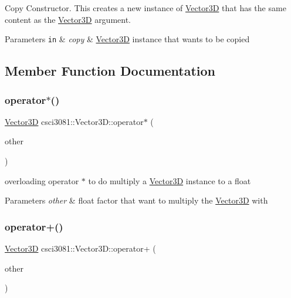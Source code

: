 Copy Constructor. This creates a new instance of \hyperlink{classcsci3081_1_1Vector3D}{Vector3D} that has the same content as the \hyperlink{classcsci3081_1_1Vector3D}{Vector3D} argument. 


\begin{DoxyParams}[1]{Parameters}
\mbox{\tt in}  & {\em copy} & \hyperlink{classcsci3081_1_1Vector3D}{Vector3D} instance that wants to be copied \\
\hline
\end{DoxyParams}


\subsection{Member Function Documentation}
\mbox{\label{classcsci3081_1_1Vector3D_a3d57c334d87583b636cbd2c02081402a}} 
\subsubsection{\texorpdfstring{operator$\ast$()}{operator*()}}
{\footnotesize\ttfamily \hyperlink{classcsci3081_1_1Vector3D}{Vector3D} csci3081\+::\+Vector3\+D\+::operator$\ast$ (\begin{DoxyParamCaption}\item[{float}]{other }\end{DoxyParamCaption})}



overloading operator $\ast$ to do multiply a \hyperlink{classcsci3081_1_1Vector3D}{Vector3D} instance to a float 


\begin{DoxyParams}{Parameters}
{\em other} & float factor that want to multiply the \hyperlink{classcsci3081_1_1Vector3D}{Vector3D} with \\
\hline
\end{DoxyParams}
\mbox{\label{classcsci3081_1_1Vector3D_ab3ee9264eb4daa31ac3e9969de69f6ed}} 
\subsubsection{\texorpdfstring{operator+()}{operator+()}}
{\footnotesize\ttfamily \hyperlink{classcsci3081_1_1Vector3D}{Vector3D} csci3081\+::\+Vector3\+D\+::operator+ (\begin{DoxyParamCaption}\item[{const \hyperlink{classcsci3081_1_1Vector3D}{Vector3D} \&}]{other }\end{DoxyParamCaption})}



